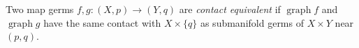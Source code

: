 Two map germs $f, g: (X, p) \to (Y, q)$ are \textit{contact equivalent} if $\operatorname{graph} f$ and $\operatorname{graph} g$ have the same contact with $X \times \{q\}$ as submanifold germs of $X \times Y$ near $(p, q)$.
